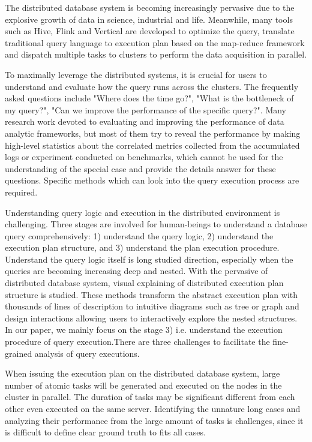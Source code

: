 The distributed database system is becoming increasingly pervasive due to the explosive growth of data in science, industrial and life.
Meanwhile, many tools such as Hive, Flink and Vertical are developed to optimize the query, translate traditional query language to execution plan based on the map-reduce framework and dispatch multiple tasks to clusters to perform the data acquisition in parallel.

To maximally leverage the distributed systems, it is crucial for users to understand and evaluate how the query runs across the clusters. The frequently asked questions include "Where does the time go?", "What is the bottleneck of my query?", "Can we improve the performance of the specific query?".  Many research work devoted to evaluating and improving the performance of data analytic frameworks, but most of them try to reveal the performance by making high-level statistics about the correlated metrics collected from the accumulated logs or experiment conducted on benchmarks, which cannot be used for the understanding of the special case and provide the details answer for these questions. Specific methods which can look into the query execution process are required.

Understanding query logic and execution in the distributed environment is challenging. Three stages are involved for human-beings to understand a database query comprehensively: 1) understand the query logic, 2) understand the execution plan structure, and 3) understand the plan execution procedure.
Understand the query logic itself is long studied direction, especially when the queries are becoming increasing deep and nested.
With the pervasive of distributed database system, visual explaining of distributed execution plan structure is studied. These methods transform the abstract execution plan with thousands of lines of description to intuitive diagrams such as tree or graph and design interactions allowing users to interactively explore the nested structures.
In our paper, we mainly focus on the stage 3) i.e. understand the execution procedure of query execution.There are three challenges to facilitate the fine-grained analysis of query executions.

When issuing the execution plan on the distributed database system, large number of atomic tasks will be generated and executed on the nodes in the cluster in parallel. The duration of tasks may be significant different from each other even executed on the same server. Identifying the unnature long cases and analyzing their performance from the large amount of tasks is challenges, since it is difficult to define clear ground truth to fits all cases.

